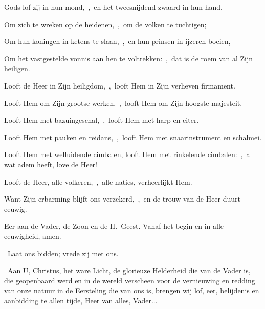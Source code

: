 \documentclass[12pt,twoside,a5paper]{article}
\begin{document}
\begin{halfparskip}
  Gods lof zij in hun mond,~\sep\ en het tweesnijdend zwaard in hun hand,

  Om zich te wreken op de heidenen,~\sep\ om de volken te tuchtigen;

  Om hun koningen in ketens te slaan,~\sep\ en hun prinsen in ijzeren boeien,

  Om het vastgestelde vonnis aan hen te voltrekken:~\sep\ dat is de roem van al Zijn heiligen.

   Looft de Heer in Zijn heiligdom,~\sep\ looft Hem in Zijn verheven firmament.

  Looft Hem om Zijn grootse werken,~\sep\ looft Hem om Zijn hoogste majesteit.

  Looft Hem met bazuingeschal,~\sep\ looft Hem met harp en citer.

  Looft Hem met pauken en reidans,~\sep\ looft Hem met snaarinstrument en schalmei.

  Looft Hem met welluidende cimbalen, looft Hem met rinkelende cimbalen:~\sep\ al wat adem heeft, love de Heer!

   Looft de Heer, alle volkeren,~\sep\ alle naties, verheerlijkt Hem.

  Want Zijn erbarming blijft ons verzekerd,~\sep\ en de trouw van de Heer duurt eeuwig.

  Eer aan de Vader, de Zoon en de H.~Geest. Vanaf het begin en in alle eeuwigheid, amen.

\end{halfparskip}

\begin{halfparskip}
  \dd~Laat ons bidden; vrede zij met ons.

  \cc~Aan U, Christus, het ware Licht, de glorieuze Helderheid die van de Vader is, die geopenbaard werd en in de wereld verscheen voor de vernieuwing en redding van onze natuur in de Eersteling die van ons is, brengen wij lof, eer, belijdenis en aanbidding te allen tijde, Heer van alles, Vader...
\end{halfparskip}



 

\vspace{0.2em}
\end{document}
